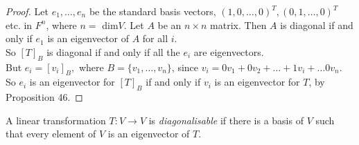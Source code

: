 \documentclass[twoside]{scrartcl}
\begin{document}
\begin{proof}
Let $e_1,\dots,e_n$ be the standard basis vectors, $(1,0,\dots,0)^T, (0,1,\dots,0)^T$ etc. in $F^n$, where $n =$ dim$V$. Let $A$ be an $n \times n$ matrix. Then $A$ is diagonal  if and only if $e_1$ is an eigenvector of $A$ for all $i$.\\

 So $[T]_B$ is diagonal if and only if all the $e_i$ are eigenvectors.\\
 
 But $e_i = [v_i]_B,$ where $B= \{v_1,\dots,v_n\}$, since $v_i = 0v_1 + 0v_2 + \dots + 1v_i + \dots 0v_n$. So $e_i$ is an eigenvector for $[T]_B$ if and only if $v_i$ is an eigenvector for $T$, by Proposition 46. 
\end{proof}

\begin{definition} A linear transformation $T: V \to V$ is \emph{diagonalisable} if there is a basis of $V$ such that every element of $V$ is an eigenvector of $T$.\end{definition}\vspace*{10pt}
\end{document}
